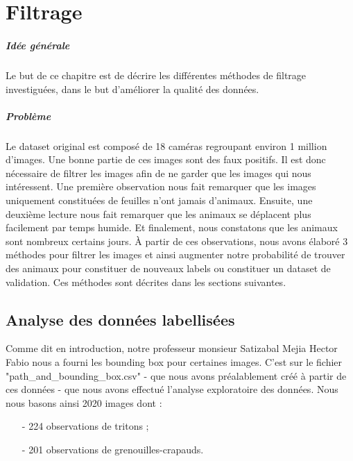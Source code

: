 \chapter{Filtrage}

\paragraph*{Idée générale}
Le but de ce chapitre est de décrire les différentes méthodes de filtrage investiguées, dans le but d'améliorer la qualité des données.

\paragraph*{Problème}
Le dataset original est composé de 18 caméras regroupant environ 1 million d'images. Une bonne partie de ces images sont des faux positifs. Il est donc nécessaire de filtrer les images afin de ne garder que les images qui nous intéressent. Une première observation nous fait remarquer que les images uniquement constituées de feuilles n'ont jamais d'animaux. Ensuite, une deuxième lecture nous fait remarquer que les animaux se déplacent plus facilement par temps humide. Et finalement, nous constatons que les animaux sont nombreux certains jours. À partir de ces observations, nous avons élaboré 3 méthodes pour filtrer les images et ainsi augmenter notre probabilité de trouver des animaux pour constituer de nouveaux labels ou constituer un dataset de validation.
Ces méthodes sont décrites dans les sections suivantes.






\section{Analyse des données labellisées}

Comme dit en introduction, notre professeur monsieur Satizabal Mejia Hector Fabio nous a fourni les bounding box pour certaines images. C'est sur le fichier "path\_and\_bounding\_box.csv" - que nous avons préalablement créé à partir de ces données - que nous avons effectué l'analyse exploratoire des données. Nous nous basons ainsi 2020 images dont :

\begin{enumerate}
    \item[-] 224 observations de tritons ;
    \item[-] 201 observations de grenouilles-crapauds.
\end{enumerate}

